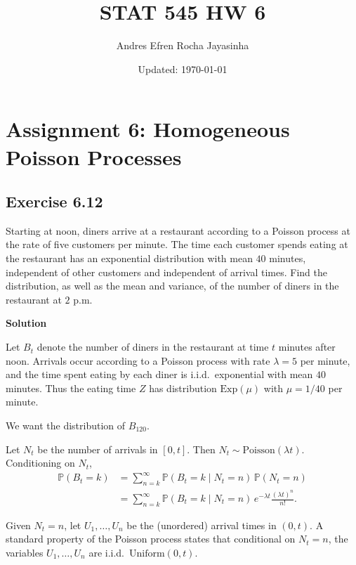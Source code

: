 \documentclass[hidelinks]{article}
\title{\textbf{STAT 545 HW 6}}
\author{Andres Efren Rocha Jayasinha}
\date{Updated: \today} %
\begin{document}
\hypersetup{bookmarksnumbered=true,}
\pagecolor{white}
\color{black}
\maketitle
\begin{Large}
\tableofcontents
\end{Large}%
\pagebreak

\section{Assignment 6: Homogeneous Poisson Processes}

\subsection{Exercise 6.12}

\noindent Starting at noon, diners arrive at a restaurant according to a Poisson process at the rate of five customers per minute. The time each customer spends eating at the restaurant has an exponential distribution with mean $40$ minutes, independent of other customers and independent of arrival times. Find the distribution, as well as the mean and variance, of the number of diners in the restaurant at $2$ p.m.

\smallskip

\noindent \textbf{Solution}

\noindent Let $B_t$ denote the number of diners in the restaurant at time $t$ minutes after noon.
Arrivals occur according to a Poisson process with rate $\lambda=5$ per minute, and the
time spent eating by each diner is i.i.d.\ exponential with mean $40$ minutes. Thus the
eating time $Z$ has distribution $\mathrm{Exp}(\mu)$ with $\mu=1/40$ per minute.

\smallskip

\noindent We want the distribution of $B_{120}$.

\medskip

\noindent Let $N_t$ be the number of arrivals in $[0,t]$. Then $N_t\sim\mathrm{Poisson}(\lambda t)$.
Conditioning on $N_t$,
\begin{align*}
\mathbb{P}(B_t=k)
&=\sum_{n=k}^{\infty}\mathbb{P}(B_t=k\mid N_t=n)\,\mathbb{P}(N_t=n)\\
&=\sum_{n=k}^{\infty}\mathbb{P}(B_t=k\mid N_t=n)\,e^{-\lambda t}\frac{(\lambda t)^n}{n!}.
\end{align*}

\medskip
\noindent Given $N_t=n$, let $U_1,\dots,U_n$ be the (unordered) arrival times in $(0,t)$.
A standard property of the Poisson process states that conditional on $N_t=n$,
the variables $U_1,\dots,U_n$ are i.i.d.\ $\mathrm{Uniform}(0,t)$.
\end{document}
